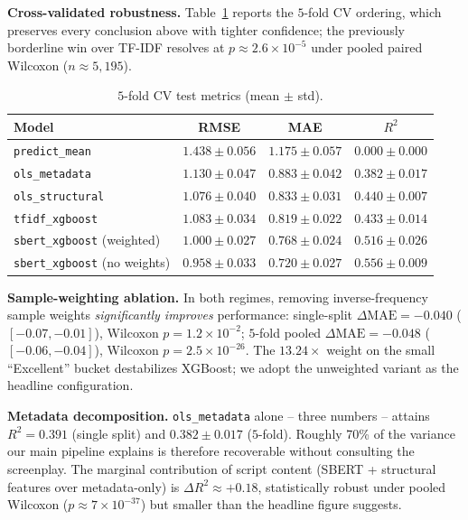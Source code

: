 \documentclass[runningheads]{llncs}
\begin{document}
\noindent\textbf{Cross-validated robustness.}
Table~\ref{tab:cv} reports the $5$-fold CV ordering, which
preserves every conclusion above with tighter confidence; the
previously borderline win over TF-IDF resolves at
$p \approx 2.6 \times 10^{-5}$ under pooled paired Wilcoxon
($n \approx 5{,}195$).

\begin{table}[t]
\caption{$5$-fold CV test metrics (mean $\pm$ std).}\label{tab:cv}
\centering
\begin{tabular}{@{}lccc@{}}
\toprule
Model & RMSE & MAE & $R^{2}$ \\
\midrule
\texttt{predict\_mean}                 & $1.438 \pm 0.056$ & $1.175 \pm 0.057$ & $0.000 \pm 0.000$ \\
\texttt{ols\_metadata}                 & $1.130 \pm 0.047$ & $0.883 \pm 0.042$ & $0.382 \pm 0.017$ \\
\texttt{ols\_structural}               & $1.076 \pm 0.040$ & $0.833 \pm 0.031$ & $0.440 \pm 0.007$ \\
\texttt{tfidf\_xgboost}                & $1.083 \pm 0.034$ & $0.819 \pm 0.022$ & $0.433 \pm 0.014$ \\
\texttt{sbert\_xgboost} (weighted)     & $1.000 \pm 0.027$ & $0.768 \pm 0.024$ & $0.516 \pm 0.026$ \\
\texttt{sbert\_xgboost} (no weights)   & $0.958 \pm 0.033$ & $0.720 \pm 0.027$ & $0.556 \pm 0.009$ \\
\bottomrule
\end{tabular}
\end{table}

\noindent\textbf{Sample-weighting ablation.}
In both regimes, removing inverse-frequency sample weights
\emph{significantly improves} performance: single-split
$\Delta\text{MAE} = -0.040$ ($[-0.07, -0.01]$), Wilcoxon
$p = 1.2 \times 10^{-2}$; $5$-fold pooled
$\Delta\text{MAE} = -0.048$ ($[-0.06, -0.04]$), Wilcoxon
$p = 2.5 \times 10^{-26}$. The $13.24\times$ weight on the small
``Excellent'' bucket destabilizes XGBoost; we adopt the unweighted
variant as the headline configuration.

\noindent\textbf{Metadata decomposition.}
\texttt{ols\_metadata} alone -- three numbers -- attains
$R^{2} = 0.391$ (single split) and $0.382 \pm 0.017$ ($5$-fold).
Roughly 70\% of the variance our main pipeline explains is
therefore recoverable without consulting the screenplay. The
marginal contribution of script content (SBERT + structural
features over metadata-only) is $\Delta R^{2} \approx +0.18$,
statistically robust under pooled Wilcoxon
($p \approx 7 \times 10^{-37}$) but smaller than the headline
figure suggests.
\end{document}
